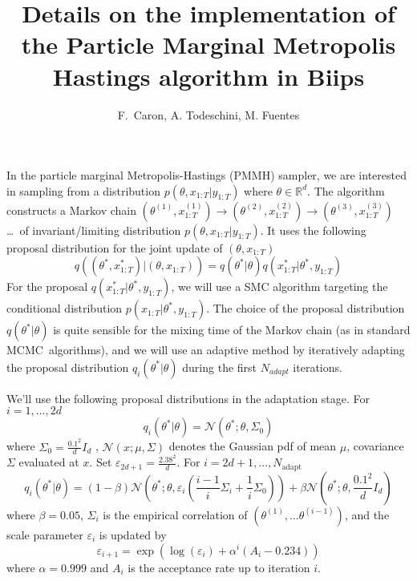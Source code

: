 \documentclass{article}%
\begin{document}
\title{Details on the implementation of the Particle Marginal Metropolis Hastings
algorithm in Biips}
\author{F.\ Caron, A. Todeschini, M. Fuentes }
\maketitle

In the particle marginal Metropolis-Hastings (PMMH) sampler, we are interested
in sampling from a distribution $p(\theta,x_{1:T}|y_{1:T})$ where $\theta
\in\mathbb{R}^{d}$. The algorithm constructs a Markov chain $(\theta
^{(1)},x_{1:T}^{(1)})\rightarrow(\theta^{(2)},x_{1:T}^{(2)})\rightarrow
(\theta^{(3)},x_{1:T}^{(3)})$\ldots\ of invariant/limiting distribution
$p(\theta,x_{1:T}|y_{1:T})$. It uses the following proposal distribution for
the joint update of $(\theta,x_{1:T})$%
\[
q((\theta^{\ast},x_{1:T}^{\ast})|(\theta,x_{1:T}))=q(\theta^{\ast}%
|\theta)q(x_{1:T}^{\ast}|\theta^{\ast},y_{1:T})
\]
For the proposal $q(x_{1:T}^{\ast}|\theta^{\ast},y_{1:T})$, we will use a SMC
algorithm targeting the conditional distribution $p(x_{1:T}|\theta^{\ast
},y_{1:T})$. The choice of the proposal distribution $q(\theta^{\ast}|\theta)$
is quite sensible for the mixing time of the Markov chain (as in standard
MCMC\ algorithms), and we will use an adaptive method by iteratively adapting
the proposal distribution $q_{i}(\theta^{\ast}|\theta)$ during the first
$N_{adapt}$ iterations. \bigskip

We'll use the following proposal distributions in the adaptation stage. For
$i=1,\ldots,2d$%
\begin{equation}
q_{i}(\theta^{\ast}|\theta)=\mathcal{N}\left(  \theta^{\ast};\theta,\Sigma
_{0}\right)
\end{equation}
where $\Sigma_{0}=\frac{0.1^{2}}{d}I_{d}$ , $\mathcal{N}(x;\mu,\Sigma)$
denotes the Gaussian pdf of mean $\mu$, covariance $\Sigma$ evaluated at $x$.
Set $\varepsilon_{2d+1}=\frac{2.38^{2}}{d}$. For $i=2d+1,\ldots
,N_{\text{adapt}}$%
\begin{equation}
q_{i}(\theta^{\ast}|\theta)=(1-\beta)\mathcal{N}\left(  \theta^{\ast}%
;\theta,\varepsilon_{i}\left(  \frac{i-1}{i}\Sigma_{i}+\frac{1}{i}\Sigma
_{0}\right)  \right)  +\beta\mathcal{N}\left(  \theta^{\ast};\theta
,\frac{0.1^{2}}{d}I_{d}\right)
\end{equation}
where $\beta=0.05$, $\Sigma_{i}$ is the empirical correlation of
$(\theta^{(1)},\ldots\theta^{(i-1)})$, and the scale parameter $\varepsilon
_{i}$ is updated by
\begin{equation}
\varepsilon_{i+1}=\exp(\log(\varepsilon_{i})+\alpha^{i}(A_{i}-0.234))
\end{equation}
where $\alpha=0.999$ and $A_{i}$ is the acceptance rate up to iteration $i$.
\end{document}
